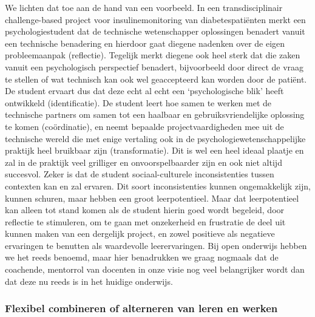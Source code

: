 \documentclass{jote-book}
\begin{document}
	We lichten dat toe aan de hand van een voorbeeld. In een transdisciplinair challenge-based project voor insulinemonitoring van diabetespatiënten merkt een psychologiestudent dat de technische wetenschapper oplossingen benadert vanuit een technische benadering en hierdoor gaat diegene nadenken over de eigen probleemaanpak (reflectie). Tegelijk merkt diegene ook heel sterk dat die zaken vanuit een psychologisch perspectief benadert, bijvoorbeeld door direct de vraag te stellen of wat technisch kan ook wel geaccepteerd kan worden door de patiënt. De student ervaart dus dat deze echt al echt een ‘psychologische blik' heeft ontwikkeld (identificatie). De student leert hoe samen te werken met de technische partners om samen tot een haalbaar en gebruiksvriendelijke oplossing te komen (coördinatie), en neemt bepaalde projectvaardigheden mee uit de technische wereld die met enige vertaling ook in de psychologiewetenschappelijke praktijk heel bruikbaar zijn (transformatie). Dit is wel een heel ideaal plaatje en zal in de praktijk veel grilliger en onvoorspelbaarder zijn en ook niet altijd succesvol. Zeker is dat de student sociaal-culturele inconsistenties tussen contexten kan en zal ervaren. Dit soort inconsistenties kunnen ongemakkelijk zijn, kunnen schuren, maar hebben een groot leerpotentieel. Maar dat leerpotentieel kan alleen tot stand komen als de student hierin goed wordt begeleid, door reflectie te stimuleren, om te gaan met onzekerheid en frustratie de deel uit kunnen maken van een dergelijk project, en zowel positieve als negatieve ervaringen te benutten als waardevolle leerervaringen. Bij open onderwijs hebben we het reeds benoemd, maar hier benadrukken we graag nogmaals dat de coachende, mentorrol van docenten in onze visie nog veel belangrijker wordt dan dat deze nu reeds is in het huidige onderwijs.



	\subsubsection{Flexibel combineren of alterneren van leren en werken}
\end{document}
